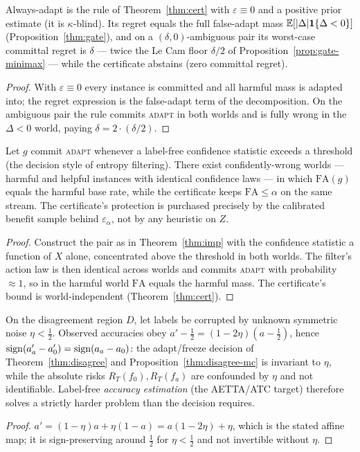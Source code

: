 \begin{proposition}\label{prop:s1}
Always-adapt is the rule of Theorem~\ref{thm:cert} with $\varepsilon\equiv0$ and a
positive prior estimate (it is $\kappa$-blind). Its regret equals the full false-adapt
mass $\mathbb{E}[|\Delta|\mathbf1\{\Delta<0\}]$ (Proposition~\ref{thm:gate}), and on a
$(\delta,0)$-ambiguous pair its worst-case committal regret is $\delta$ --- twice the
Le Cam floor $\delta/2$ of Proposition~\ref{prop:gate-minimax} --- while the certificate
abstains (zero committal regret).
\end{proposition}
\begin{proof}
With $\varepsilon\equiv0$ every instance is committed and all harmful mass is adapted
into; the regret expression is the false-adapt term of the decomposition. On the
ambiguous pair the rule commits \textsc{adapt} in both worlds and is fully wrong in the
$\Delta<0$ world, paying $\delta=2\cdot(\delta/2)$.
\end{proof}

\begin{proposition}\label{prop:s2}
Let $g$ commit \textsc{adapt} whenever a label-free confidence statistic exceeds a
threshold (the decision style of entropy filtering). There exist confidently-wrong worlds
--- harmful and helpful instances with identical confidence laws --- in which
$\mathrm{FA}(g)$ equals the harmful base rate, while the certificate keeps
$\mathrm{FA}\le\alpha$ on the same stream. The certificate's protection is purchased
precisely by the calibrated benefit sample behind $\varepsilon_\alpha$, not by any
heuristic on $Z$.
\end{proposition}
\begin{proof}
Construct the pair as in Theorem~\ref{thm:imp} with the confidence statistic a function
of $X$ alone, concentrated above the threshold in both worlds. The filter's action law is
then identical across worlds and commits \textsc{adapt} with probability $\approx1$, so in
the harmful world $\mathrm{FA}$ equals the harmful mass. The certificate's bound is
world-independent (Theorem~\ref{thm:cert}).
\end{proof}

\begin{proposition}\label{prop:s3}
On the disagreement region $D$, let labels be corrupted by unknown symmetric noise
$\eta<\tfrac12$. Observed accuracies obey
$a'-\tfrac12=(1-2\eta)(a-\tfrac12)$, hence
$\operatorname{sign}(a_a'-a_0')=\operatorname{sign}(a_a-a_0)$: the adapt/freeze decision of
Theorem~\ref{thm:disagree} and Proposition~\ref{thm:disagree-mc} is invariant to $\eta$, while the
absolute risks $R_T(f_0),R_T(f_a)$ are confounded by $\eta$ and not identifiable.
Label-free \emph{accuracy estimation} (the AETTA/ATC target) therefore solves a strictly
harder problem than the decision requires.
\end{proposition}
\begin{proof}
$a'=(1-\eta)a+\eta(1-a)=a(1-2\eta)+\eta$, which is the stated affine map; it is
sign-preserving around $\tfrac12$ for $\eta<\tfrac12$ and not invertible without $\eta$.
\end{proof}

